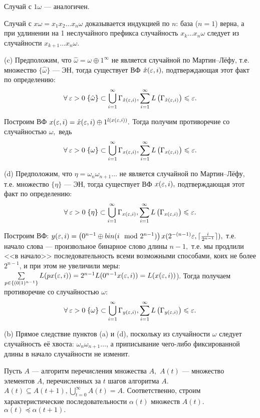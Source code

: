 Случай с $1\omega$ --- аналогичен. 

Случай с $x\omega=x_1x_2\ldots x_n\omega$ доказывается индукцией по $n$: база ($n=1$) верна, а при удлинении на 1 неслучайного префикса случайность $x_k\ldots x_n\omega$ следует из случайности $x_{k+1}\ldots x_n\omega$.

(c) Предположим, что $\hat \omega = \omega\oplus 1^\infty$ не является случайной по Мартин--Лёфу, т.е. множество $\{\hat \omega\}$ --- ЭН, тогда существует ВФ $\hat x(\varepsilon,i),$ подтверждающая этот факт по определению: 
$$\forall\: \varepsilon > 0 \;
\{\hat \omega\}\subset \bigcup\limits_{i=1}^\infty\Gamma_{\hat x(\varepsilon,i)}, 
\sum\limits_{i=1}^\infty L\left(\Gamma_{\hat x(\varepsilon,i)}\right) \leqslant \varepsilon.$$

Построим ВФ  $x(\varepsilon,i) = \hat x(\varepsilon,i)\oplus 1^{l\left(x(\varepsilon,i)\right)}.$ Тогда получим противоречие со случайностью $\omega,$ ведь
$$\forall\: \varepsilon > 0 \;
\{\omega\}\subset \bigcup\limits_{i=1}^\infty\Gamma_{x(\varepsilon,i)}, 
\sum\limits_{i=1}^\infty L\left(\Gamma_{x(\varepsilon,i)}\right) \leqslant \varepsilon.$$

(d) Предположим, что $\eta = \omega_n\omega_{n+1}\ldots$ не является случайной по Мартин--Лёфу, т.е. множество $\{\eta\}$ --- ЭН, тогда существует ВФ $x(\varepsilon,i),$ подтверждающая этот факт по определению: 
$$\forall\: \varepsilon > 0 \;
\{\eta\}\subset \bigcup\limits_{i=1}^\infty\Gamma_{ x(\varepsilon,i)}, 
\sum\limits_{i=1}^\infty L\left(\Gamma_{x(\varepsilon,i)}\right) \leqslant \varepsilon.$$

Построим ВФ:  $y(\varepsilon,i) = \left(0^{n-1}\oplus bin(i \mod 2^{n-1}) \right)x(2^{-(n-1)}\varepsilon,\lceil\frac i {2^{n-1}}\rceil),$ т.е. начало слова --- произвольное бинарное слово длины $n-1,$ т.е. мы продлили <<в начало>> последовательность всеми возможными способами, коих не более $2^{n-1}$, и при этом не увеличили меры: $\sum\limits_{p\in \{(0|1)^{n-1}\}}L(px(\varepsilon,i)) = 2^{n-1}L(0^{n-1}x(\varepsilon,i)) = L(x(\varepsilon,i))$).
Тогда получаем противоречие со случайностью $\omega$:
$$\forall\: \varepsilon > 0 \;
\{\omega\}\subset \bigcup\limits_{i=1}^\infty\Gamma_{ y(\varepsilon,i)}, 
\sum\limits_{i=1}^\infty L\left(\Gamma_{y(\varepsilon,i)}\right) \leqslant \varepsilon.$$

(b) Прямое следствие пунктов (a) и (d), поскольку из случайности $\omega$ следует случайность её хвоста:  $\omega_n\omega_{n+1}\ldots$, а приписывание чего-либо фиксированной длины в начало случайности не изменит.


Пусть $A$ --- алгоритм перечисления множества $A,$ $A(t)$ --- множество элементов $A$, перечисленных за $t$ шагов алгоритма $A$. $A(t)\subseteq A(t+1), \bigcup\limits_{t=0}^\infty A(t) = A.$ Соответственно, строим характеристические последовательности $\alpha(t)$ множеств $A(t)$. $\alpha(t)\preccurlyeq\alpha(t+1).$


